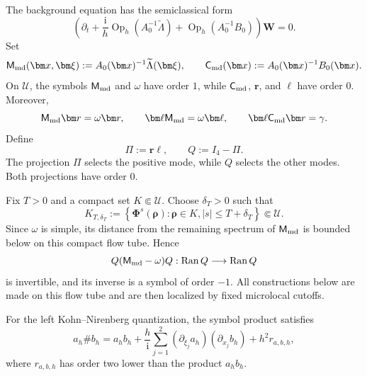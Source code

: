 \documentclass[11pt,reqno]{amsart}
\newcommand{\ii}{\mathrm{i}}
\newcommand{\Op}{\operatorname{Op}}
\numberwithin{equation}{section}
\begin{document}
The background equation has the semiclassical form
\begin{equation}\label{eq:semiclassical-system}
    \left(\partial_t+\frac{\ii}{h}\Op_h(A_0^{-1}\widetilde\Lambda)+\Op_h(A_0^{-1}B_0)\right)\bm W=0.
\end{equation}
Set
\begin{equation*}
    \mathsf M_{\rm md}(\bm x,\bm\xi):=A_0(\bm x)^{-1}\widetilde\Lambda(\bm\xi),
    \qquad
    \mathsf C_{\rm md}(\bm x):=A_0(\bm x)^{-1}B_0(\bm x).
\end{equation*}
On $\mathcal U$, the symbols $\mathsf M_{\rm md}$ and $\omega$ have order $1$, while $\mathsf C_{\rm md}$, $\bm r$, and $\bm\ell$ have order $0$. Moreover,
\begin{equation*}
    \mathsf M_{\rm md}\bm r=\omega\bm r,
    \qquad
    \bm\ell \mathsf M_{\rm md}=\omega\bm\ell,
    \qquad
    \bm\ell \mathsf C_{\rm md}\bm r=\gamma.
\end{equation*}
Define
\begin{equation*}
    \Pi:=\bm r\bm\ell,
    \qquad
    Q:=I_4-\Pi.
\end{equation*}
The projection $\Pi$ selects the positive mode, while $Q$ selects the other modes. Both projections have order $0$.

Fix $T>0$ and a compact set $K\Subset\mathcal U$. Choose $\delta_T>0$ such that
\begin{equation*}
    K_{T,\delta_T}:=\left\{\bm\Phi^s(\bm\rho):\bm\rho\in K, |s|\le T+\delta_T\right\}\Subset\mathcal U.
\end{equation*}
Since $\omega$ is simple, its distance from the remaining spectrum of $\mathsf M_{\rm md}$ is bounded below on this compact flow tube. Hence
\begin{equation*}
    Q(\mathsf M_{\rm md}-\omega)Q:\operatorname{Ran}Q\longrightarrow\operatorname{Ran}Q
\end{equation*}
is invertible, and its inverse is a symbol of order $-1$. All constructions below are made on this flow tube and are then localized by fixed microlocal cutoffs.

For the left Kohn--Nirenberg quantization, the symbol product satisfies
\begin{equation}\label{eq:symbol-product}
    a_h\# b_h = a_hb_h+\frac{h}{\ii}\sum_{j=1}^2(\partial_{\xi_j}a_h)(\partial_{x_j}b_h)+h^2r_{a,b,h},
\end{equation}
where $r_{a,b,h}$ has order two lower than the product $a_hb_h$.
\end{document}

